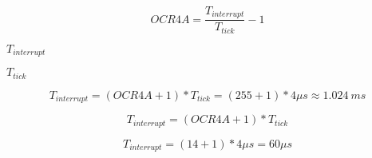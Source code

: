 \documentclass{article}
\begin{document}
\[OCR4A = \frac{T_{interrupt}}{T_{tick}} - 1
\]
\pagebreak

$T_{interrupt}$
\pagebreak

$T_{tick}$
\pagebreak

\[T_{interrupt} = (OCR4A + 1) * T_{tick} = (255 + 1) * 4\mu s \approx 1.024\ ms
\]
\pagebreak

\[T_{interrupt} = (OCR4A + 1) * T_{tick}
\]
\pagebreak

\[T_{interrupt} = (14 + 1) * 4\mu s = 60\mu s
\]
\pagebreak
\end{document}

